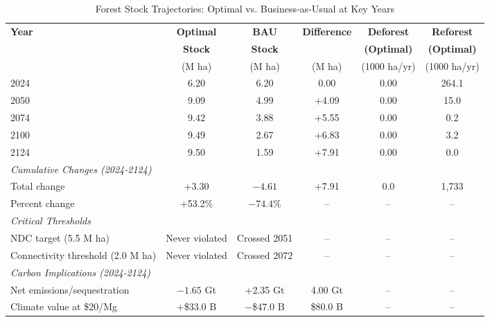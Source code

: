 \begin{table}[htbp]
\centering
\caption{Forest Stock Trajectories: Optimal vs. Business-as-Usual at Key Years}
\label{tab:comparison_trajectories}
\small
\begin{tabular}{lccccc}
\hline\hline
\textbf{Year} & \textbf{Optimal} & \textbf{BAU} & \textbf{Difference} & \textbf{Deforest} & \textbf{Reforest} \\
 & \textbf{Stock} & \textbf{Stock} & & \textbf{(Optimal)} & \textbf{(Optimal)} \\
 & (M ha) & (M ha) & (M ha) & (1000 ha/yr) & (1000 ha/yr) \\
\hline
2024 & 6.20 & 6.20 & 0.00 & 0.00 & 264.1 \\
2050 & 9.09 & 4.99 & +4.09 & 0.00 & 15.0 \\
2074 & 9.42 & 3.88 & +5.55 & 0.00 & 0.2 \\
2100 & 9.49 & 2.67 & +6.83 & 0.00 & 3.2 \\
2124 & 9.50 & 1.59 & +7.91 & 0.00 & 0.0 \\
\hline
\multicolumn{6}{l}{\textit{Cumulative Changes (2024-2124)}} \\
\quad Total change & +3.30 & $-4.61$ & +7.91 & 0.0 & 1,733 \\
\quad Percent change & +53.2\% & $-74.4\%$ & -- & -- & -- \\
\hline
\multicolumn{6}{l}{\textit{Critical Thresholds}} \\
\quad NDC target (5.5 M ha) & Never violated & Crossed 2051 & -- & -- & -- \\
\quad Connectivity threshold (2.0 M ha) & Never violated & Crossed 2072 & -- & -- & -- \\
\hline
\multicolumn{6}{l}{\textit{Carbon Implications (2024-2124)}} \\
\quad Net emissions/sequestration & $-1.65$ Gt & +2.35 Gt & 4.00 Gt & -- & -- \\
\quad Climate value at \$20/Mg & +\$33.0 B & $-$\$47.0 B & \$80.0 B & -- & -- \\
\hline\hline
\end{tabular}
\end{table}
